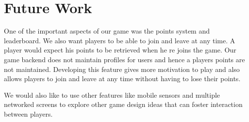 \documentclass{sig-alternate}
\begin{document}
\section{Future Work}
One of the important aspects of our game was the points system and leaderboard. We also want players to be able 
to join and leave at any time. A player would expect his points to be retrieved when he re joins the game. Our 
game backend does not maintain profiles for users and hence a players points are not maintained. Developing 
this feature gives more motivation to play and also allows players to join and leave at any time without having 
to lose their points.

We would also like to use other features like mobile sensors and multiple networked screens to explore other 
game design ideas that can foster interaction between players.



\end{document}
